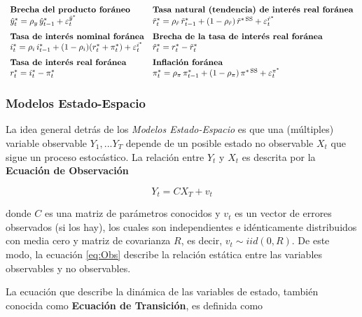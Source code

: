 \documentclass[
]{book}
\begin{document}
\[
\begin{array}{ll}
\text{\textbf{Brecha del producto foráneo}} & \text{\textbf{Tasa natural (tendencia) de interés real foránea}} \\
\hat{y}^{*}_{t} = \rho_{y}\,\hat{y}^{*}_{t-1} + \varepsilon^{\hat{y}^{*}}_{t} 
& \tilde{r}^{*}_{t} = \rho_{\tilde r}\,\tilde{r}^{*}_{t-1} + (1 - \rho_{\tilde r})\,\tilde{r}^{*\,\mathrm{SS}} + \varepsilon^{\tilde{r}^{*}}_{t} \\[1.5ex]
\text{\textbf{Tasa de interés nominal foránea}} & \text{\textbf{Brecha de la tasa de interés real foránea}} \\
i^{*}_{t} = \rho_{i}\,i^{*}_{t-1} + (1 - \rho_{i})(r^{*}_{t} + \pi^{*}_{t}) + \varepsilon^{i^{*}}_{t} 
& \hat{r}^{*}_{t} = r^{*}_{t} - \tilde{r}^{*}_{t} \\[1.5ex]
\text{\textbf{Tasa de interés real foránea}} & \text{\textbf{Inflación foránea}} \\
r^{*}_{t} = i^{*}_{t} - \pi^{*}_{t} 
& \pi^{*}_{t} = \rho_{\pi}\,\pi^{*}_{t-1} + (1 - \rho_{\pi})\,\pi^{*\,\mathrm{SS}} + \varepsilon^{\pi^{*}}_{t}
\end{array}
\]

\hypertarget{modelos-estado-espacio}{%
\subsubsection{Modelos Estado-Espacio}\label{modelos-estado-espacio}}

La idea general detrás de los \emph{Modelos Estado-Espacio} es que una (múltiples) variable observable \(Y_1,...Y_T\) depende de un posible estado no observable \(X_t\) que sigue un proceso estocástico. La relación entre \(Y_t\) y \(X_t\) es descrita por la \textbf{Ecuación de Observación}

\begin{equation}
Y_t = C X_T + v_t
\label{eq:Obs}
\end{equation}

donde \(C\) es una matriz de parámetros conocidos y \(v_t\) es un vector de errores observados (si los hay), los cuales son independientes e idénticamente distribuidos con media cero y matriz de covarianza \(R\), es decir, \(v_t \sim iid(0, R)\). De este modo, la ecuación \eqref{eq:Obs} describe la relación estática entre las variables observables y no observables.

La ecuación que describe la dinámica de las variables de estado, también conocida como \textbf{Ecuación de Transición}, es definida como
\end{document}
